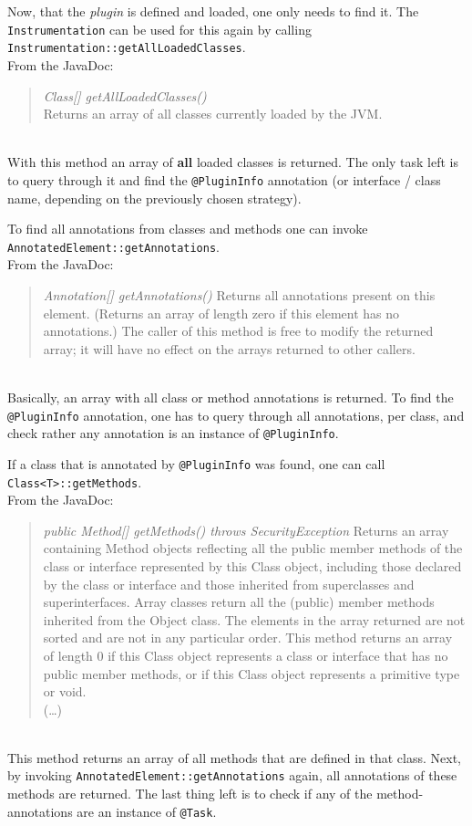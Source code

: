 Now, that the \textit{plugin} is defined and loaded, one only needs to find it.
The \lstinline{Instrumentation} can be used for this again by calling \lstinline{Instrumentation::getAllLoadedClasses}.\\
From the JavaDoc:
\begin{quote}
    \textit{Class[] getAllLoadedClasses()}\\
    Returns an array of all classes currently loaded by the JVM.
\end{quote}~\textcite{javadoc:instrumentation}\\
With this method an array of \textbf{all} loaded classes is returned.
The only task left is to query through it and find the \lstinline{@PluginInfo} annotation (or interface / class name, depending on the previously chosen strategy).

To find all annotations from classes and methods one can invoke \lstinline{AnnotatedElement::getAnnotations}.\\
From the JavaDoc:
\begin{quote}
    \textit{Annotation[] getAnnotations()}
    Returns all annotations present on this element. (Returns an array of length zero if this element has no annotations.) The caller of this method is free to modify the returned array; it will have no effect on the arrays returned to other callers.
\end{quote}~\textcite{javadoc:annotated_element}\\
Basically, an array with all class or method annotations is returned.
To find the \lstinline{@PluginInfo} annotation, one has to query through all annotations, per class, and check rather any annotation is an instance of \lstinline{@PluginInfo}.

If a class that is annotated by \lstinline{@PluginInfo} was found, one can call \lstinline{Class<T>::getMethods}.\\
From the JavaDoc:
\begin{quote}
    \textit{public Method[] getMethods() throws SecurityException}
    Returns an array containing Method objects reflecting all the public member methods of the class or interface represented by this Class object, including those declared by the class or interface and those inherited from superclasses and superinterfaces. Array classes return all the (public) member methods inherited from the Object class. The elements in the array returned are not sorted and are not in any particular order. This method returns an array of length 0 if this Class object represents a class or interface that has no public member methods, or if this Class object represents a primitive type or void.\\
    (\dots)
\end{quote}~\textcite{javadoc:class}\\
This method returns an array of all methods that are defined in that class.
Next, by invoking \lstinline{AnnotatedElement::getAnnotations} again, all annotations of these methods are returned.
The last thing left is to check if any of the method-annotations are an instance of \lstinline{@Task}.

